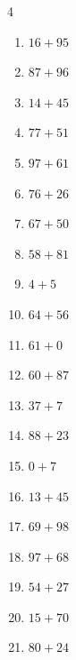 \begin{multicols}{4}
\begin{enumerate}
  \item $16+95$
        \phantom{$=111$}

  \item $87+96$
        \phantom{$=183$}

  \item $14+45$
        \phantom{$=59$}

\columnbreak %

  \item $77+51$
        \phantom{$=128$}

  \item $97+61$
        \phantom{$=158$}

  \item $76+26$
        \phantom{$=102$}

  \item $67+50$
        \phantom{$=117$}

  \item $58+81$
        \phantom{$=139$}

  \item $4+5$
        \phantom{$=9$}

  \item $64+56$
        \phantom{$=120$}

  \item $61+0$
        \phantom{$=61$}

  \item $60+87$
        \phantom{$=147$}

  \item $37+7$
        \phantom{$=44$}

  \item $88+23$
        \phantom{$=111$}

  \item $0+7$
        \phantom{$=7$}

  \item $13+45$
        \phantom{$=58$}

  \item $69+98$
        \phantom{$=167$}

  \item $97+68$
        \phantom{$=165$}

  \item $54+27$
        \phantom{$=81$}

  \item $15+70$
        \phantom{$=85$}

  \item $80+24$
        \phantom{$=104$}


\end{enumerate}
\end{multicols}
